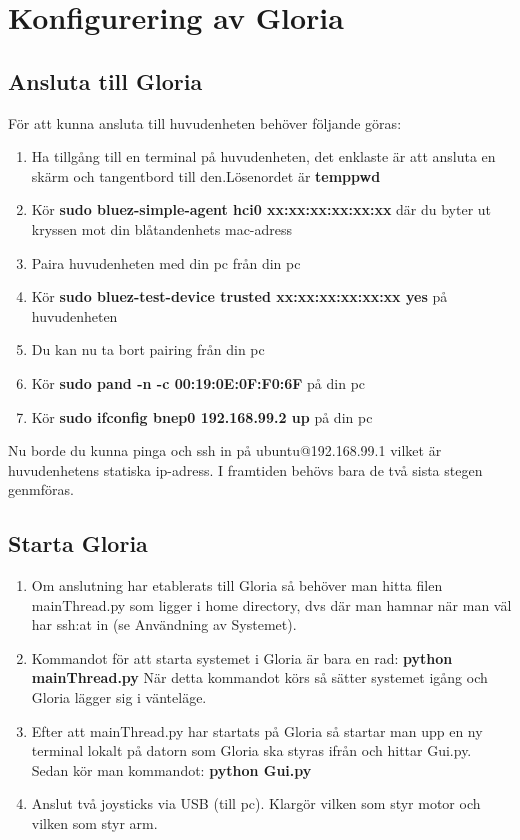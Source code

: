 \section{Konfigurering av Gloria}

\subsection{Ansluta till Gloria}
För att kunna ansluta till huvudenheten behöver följande göras:
\begin{enumerate}
	\item Ha tillgång till en terminal på huvudenheten, det enklaste är att ansluta en skärm och tangentbord till den.\newline Lösenordet är \textbf{temppwd}
	\item Kör \textbf{sudo bluez-simple-agent hci0 xx:xx:xx:xx:xx:xx} där du byter ut kryssen mot din blåtandenhets mac-adress
	\item Paira huvudenheten med din pc från din pc
	\item Kör \textbf{sudo bluez-test-device trusted xx:xx:xx:xx:xx:xx yes} på huvudenheten
	\item Du kan nu ta bort pairing från din pc
	\item Kör \textbf{sudo pand -n -c 00:19:0E:0F:F0:6F	} på din pc
	\item Kör \textbf{sudo ifconfig bnep0 192.168.99.2 up } på din pc
\end{enumerate}
Nu borde du kunna pinga och ssh in på ubuntu@192.168.99.1 vilket är huvudenhetens statiska ip-adress. I framtiden behövs bara de två sista stegen genmföras.
\subsection{Starta Gloria}
\begin{enumerate}
	\item Om anslutning har etablerats till Gloria så behöver man hitta filen mainThread.py som ligger i home directory, dvs där man hamnar när man väl har ssh:at in (se Användning av Systemet).
	\item Kommandot för att starta systemet i Gloria är bara en rad: \textbf{python mainThread.py}
	När detta kommandot körs så sätter systemet igång och Gloria lägger sig i vänteläge.
	\item Efter att mainThread.py har startats på Gloria så startar man upp en ny terminal lokalt på datorn som Gloria ska styras ifrån och hittar Gui.py. Sedan kör man kommandot: \textbf{python Gui.py}
	\item Anslut två joysticks via USB (till pc). Klargör vilken som styr motor och vilken som styr arm.
\end{enumerate}
